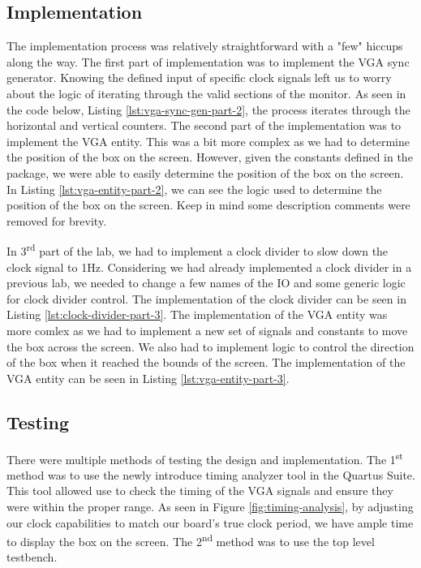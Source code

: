 \documentclass{article}
\begin{document}
\subsection*{Implementation}
The implementation process was relatively straightforward with a "few" hiccups along the way. The first part of implementation was to implement the VGA sync generator. Knowing the defined input of specific clock signals left us to worry about the logic of iterating through the valid sections of the monitor. As seen in the code below, Listing \ref{lst:vga-sync-gen-part-2}, the process iterates through the horizontal and vertical counters. The second part of the implementation was to implement the VGA entity. This was a bit more complex as we had to determine the position of the box on the screen. However, given the constants defined in the package, we were able to easily determine the position of the box on the screen. In Listing \ref{lst:vga-entity-part-2}, we can see the logic used to determine the position of the box on the screen. Keep in mind some description comments were removed for brevity.

In 3\textsuperscript{rd} part of the lab, we had to implement a clock divider to slow down the clock signal to 1Hz. Considering we had already implemented a clock divider in a previous lab, we needed to change a few names of the IO and some generic logic for clock divider control. The implementation of the clock divider can be seen in Listing \ref{lst:clock-divider-part-3}. The implementation of the VGA entity was more comlex as we had to implement a new set of signals and constants to move the box across the screen. We also had to implement logic to control the direction of the box when it reached the bounds of the screen. The implementation of the VGA entity can be seen in Listing \ref{lst:vga-entity-part-3}.

\subsection*{Testing}
There were multiple methods of testing the design and implementation. The 1\textsuperscript{st} method was to use the newly introduce timing analyzer tool in the Quartus Suite. This tool allowed use to check the timing of the VGA signals and ensure they were within the proper range. As seen in Figure \ref*{fig:timing-analysis}, by adjusting our clock capabilities to match our board's true clock period, we have ample time to display the box on the screen. The 2\textsuperscript{nd} method was to use the top level testbench.
\end{document}
